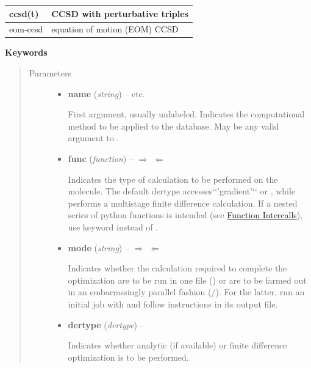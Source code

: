 \documentclass[letterpaper,10pt,english]{sphinxmanual}
\begin{document}
\begin{fulllineitems}
\begin{tabulary}{\linewidth}{|L|L|}
ccsd(t)
 & 
CCSD with perturbative triples
\\\hline

eom-ccsd
 & 
equation of motion (EOM) CCSD
\\\hline
\end{tabulary}


\textbf{Keywords}
\begin{quote}\begin{description}
\item[{Parameters}] \leavevmode\begin{itemize}
\item {} 
\textbf{name} (\emph{string}) -- 
 \textbar{}\textbar{}  \textbar{}\textbar{}  \textbar{}\textbar{} etc.

First argument, usually unlabeled. Indicates the computational method
to be applied to the database. May be any valid argument to
{\hyperref[index:driver.energy]{}}.


\item {} 
\textbf{func} (\emph{function}) -- 
$\Rightarrow$  $\Leftarrow$ \textbar{}\textbar{}  \textbar{}\textbar{} 

Indicates the type of calculation to be performed on the molecule.
The default dertype accesses{}`{}`'gradient'{}`{}` or , while
 performs a multistage finite difference calculation.
If a nested series of python functions is intended (see {\hyperref[index:function-intercalls]{Function Intercalls}}),
use keyword  instead of .


\item {} 
\textbf{mode} (\emph{string}) -- 
$\Rightarrow$  $\Leftarrow$ \textbar{}\textbar{}  \textbar{}\textbar{} 

Indicates whether the calculation required to complete the
optimization are to be run in one file () or are to be
farmed out in an embarrassingly parallel fashion
(/).  For the latter, run an initial job with
 and follow instructions in its output file.


\item {} 
\textbf{dertype} (\emph{dertype}) -- 
 \textbar{}\textbar{} 

Indicates whether analytic (if available) or finite difference
optimization is to be performed.



\end{itemize}
\end{description}
\end{quote}
\end{fulllineitems}
\end{document}
